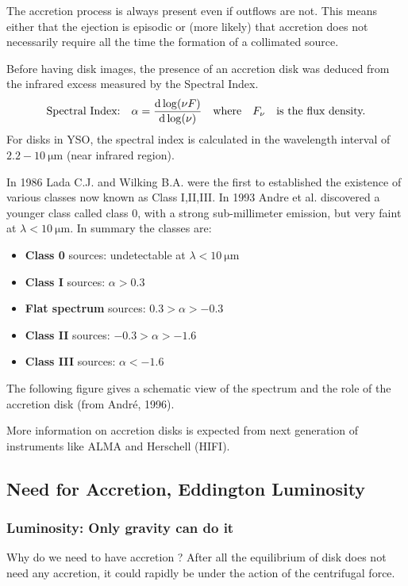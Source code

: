 \documentclass[10pt,a4paper,english,draft]{article}
\begin{document}
The accretion process is always present even if outflows are not. This means
either that the ejection is episodic or (more likely) that accretion does not
necessarily require all the time the formation of a collimated source.

Before having disk images, the presence of an accretion disk was deduced from
the infrared excess measured by the Spectral Index. \[\text{Spectral
Index:}\quad \alpha=\frac{\mathrm{d}\log(\nu F)}{\mathrm{d} \log(\nu)}\quad\text{where}\quad
F_{\nu}\quad\text{is the flux density.}\] For disks in YSO, the spectral index
is calculated in the wavelength interval of $2.2-\SI{10}{\um}$ (near infrared
region).

In 1986 Lada C.J. and Wilking B.A. were the first to established the existence
of various classes now known as Class I,II,III. In 1993 Andre et al. discovered
a younger class called class 0, with a strong sub-millimeter emission, but very
faint at $\lambda<\SI{10}{\um}$. In summary the classes are:
\begin{itemize}
    \item \textbf{Class 0} sources: undetectable at $\lambda<\SI{10}{\um}$
    \item \textbf{Class I} sources: $\alpha>0.3$
    \item \textbf{Flat spectrum} sources: $0.3>\alpha>-0.3$
    \item \textbf{Class II} sources: $-0.3>\alpha>-1.6$
    \item \textbf{Class III} sources: $\alpha<-1.6$
\end{itemize}

The following figure gives a schematic view of the spectrum and the role of the
accretion disk (from André, 1996).

More information on accretion disks is expected from next generation of
instruments like ALMA and Herschell (HIFI).

\subsection{Need for Accretion, Eddington Luminosity}

\subsubsection{Luminosity: Only gravity can do it}

Why do we need to have accretion ? After all the equilibrium of disk does not
need any accretion, it could rapidly be under the action of the centrifugal
force.
\end{document}
